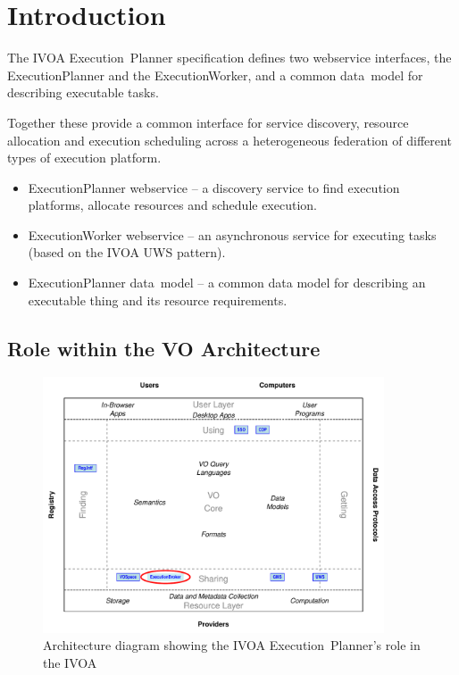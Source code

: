 \documentclass[11pt,a4paper]{ivoa}
\newcommand{\datamodel} {data~model}
\newcommand{\webservice} {webservice}
\newcommand{\ivoa} {IVOA}
\newcommand{\uws} {UWS}
\newcommand{\execplanner} {ExecutionPlanner}
\newcommand{\execworker} {ExecutionWorker}
\newcommand{\executionplanner} {Execution~Planner}
\begin{document}
\section{Introduction}
\label{introduction}

The \ivoa{} \executionplanner{} specification defines two \webservice{} interfaces,
the \execplanner{} and the \execworker{}, and a common \datamodel{} for describing
executable tasks.

Together these provide a common interface for service discovery, resource allocation
and execution scheduling across a heterogeneous federation of different types of
execution platform.

\begin{itemize}
    \item \execplanner{} \webservice{} – a discovery service to find execution platforms, allocate resources and schedule execution.
    \item \execworker{} \webservice{} – an asynchronous service for executing tasks (based on the \ivoa{} \uws{} pattern).
    \item \execplanner{} \datamodel{} – a common data model for describing an executable thing and its resource requirements.
\end{itemize}

\subsection{Role within the VO Architecture}
\label{subsec:ivoarole}

\begin{figure}
\centering
\includegraphics[width=0.9\textwidth]{role_diagram.pdf}
\caption{Architecture diagram showing the \ivoa{} \executionplanner{}'s role in the \ivoa}
\label{fig:archdiag}
\end{figure}
\end{document}
